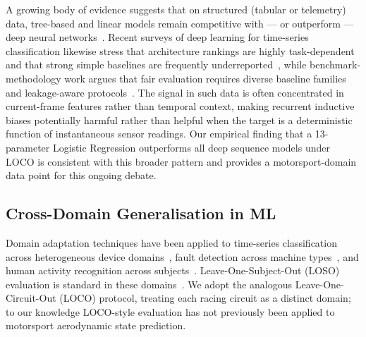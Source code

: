 \documentclass[conference,a4paper]{IEEEtran}
\begin{document}
A growing body of evidence suggests that on structured (tabular or telemetry) data,
tree-based and linear models remain competitive with — or outperform — deep neural
networks~\cite{ref_grinsztajn}.
Recent surveys of deep learning for time-series classification likewise stress that
architecture rankings are highly task-dependent and that strong simple baselines are
frequently underreported~\cite{ref_foumani}, while benchmark-methodology work argues
that fair evaluation requires diverse baseline families and leakage-aware
protocols~\cite{ref_tfb}.
The signal in such data is often concentrated in current-frame features rather than
temporal context, making recurrent inductive biases potentially harmful rather than
helpful when the target is a deterministic function of instantaneous sensor readings.
Our empirical finding that a 13-parameter Logistic Regression outperforms all deep
sequence models under LOCO is consistent with this broader pattern and provides a
motorsport-domain data point for this ongoing debate.

\subsection{Cross-Domain Generalisation in ML}

Domain adaptation techniques have been applied to time-series classification across
heterogeneous device domains~\cite{ref_adatime}, fault detection across machine
types~\cite{ref_fault_da}, and human activity recognition across subjects~\cite{ref_har_da}.
Leave-One-Subject-Out (LOSO) evaluation is standard in these domains~\cite{ref_har_da}.
We adopt the analogous Leave-One-Circuit-Out (LOCO) protocol, treating each racing
circuit as a distinct domain; to our knowledge LOCO-style evaluation has not previously
been applied to motorsport aerodynamic state prediction.
\end{document}
